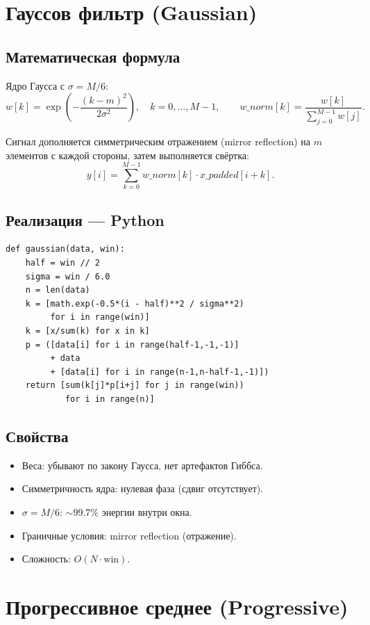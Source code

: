 \documentclass[12pt,a4paper]{article}
\begin{document}
\section{Гауссов фильтр (Gaussian)}

\subsection{Математическая формула}

Ядро Гаусса с $\sigma = M / 6$:
\[
w[k] = \exp\!\left(-\frac{(k - m)^2}{2\sigma^2}\right), \quad k = 0, \ldots, M{-}1,
\qquad
w\_norm[k] = \frac{w[k]}{\sum_{j=0}^{M-1} w[j]}.
\]

Сигнал дополняется симметрическим отражением (mirror reflection) на $m$ элементов с каждой стороны, затем выполняется свёртка:
\[
y[i] = \sum_{k=0}^{M-1} w\_norm[k] \cdot x\_padded[i + k].
\]

\subsection{Реализация --- Python}

\begin{lstlisting}
def gaussian(data, win):
    half = win // 2
    sigma = win / 6.0
    n = len(data)
    k = [math.exp(-0.5*(i - half)**2 / sigma**2)
         for i in range(win)]
    k = [x/sum(k) for x in k]
    p = ([data[i] for i in range(half-1,-1,-1)]
         + data
         + [data[i] for i in range(n-1,n-half-1,-1)])
    return [sum(k[j]*p[i+j] for j in range(win))
            for i in range(n)]
\end{lstlisting}

\subsection{Свойства}

\begin{itemize}
  \item Веса: убывают по закону Гаусса, нет артефактов Гиббса.
  \item Симметричность ядра: нулевая фаза (сдвиг отсутствует).
  \item $\sigma = M/6$: $\sim$99.7\% энергии внутри окна.
  \item Граничные условия: mirror reflection (отражение).
  \item Сложность: $O(N \cdot \text{win})$.
\end{itemize}

\section{Прогрессивное среднее (Progressive)}
\end{document}

